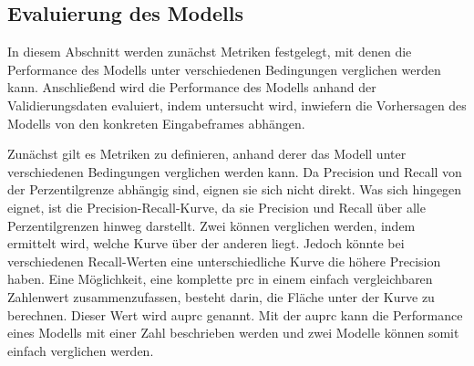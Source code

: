 \subsection{Evaluierung des Modells}
\label{sec:Evaluierung}
In diesem Abschnitt werden zunächst Metriken festgelegt, mit denen die Performance des Modells unter verschiedenen Bedingungen verglichen werden kann.
Anschließend wird die Performance des Modells anhand der Validierungsdaten evaluiert, indem untersucht wird, inwiefern die Vorhersagen des Modells von den konkreten Eingabeframes abhängen.

Zunächst gilt es Metriken zu definieren, anhand derer das Modell unter verschiedenen Bedingungen verglichen werden kann.
Da Precision und Recall von der Perzentilgrenze abhängig sind, eignen sie sich nicht direkt.
Was sich hingegen eignet, ist die Precision-Recall-Kurve, da sie Precision und Recall über alle Perzentilgrenzen hinweg darstellt.
Zwei  können verglichen werden, indem ermittelt wird, welche Kurve über der anderen liegt.
Jedoch könnte bei verschiedenen Recall-Werten eine unterschiedliche Kurve die höhere Precision haben.
Eine Möglichkeit, eine komplette \acrshort{prc} in einem einfach vergleichbaren Zahlenwert zusammenzufassen, besteht darin, die Fläche unter der Kurve zu berechnen.
Dieser Wert wird \acrfull{auprc} genannt.
Mit der \acrshort{auprc} kann die Performance eines Modells mit einer Zahl beschrieben werden und zwei Modelle können somit einfach verglichen werden.

